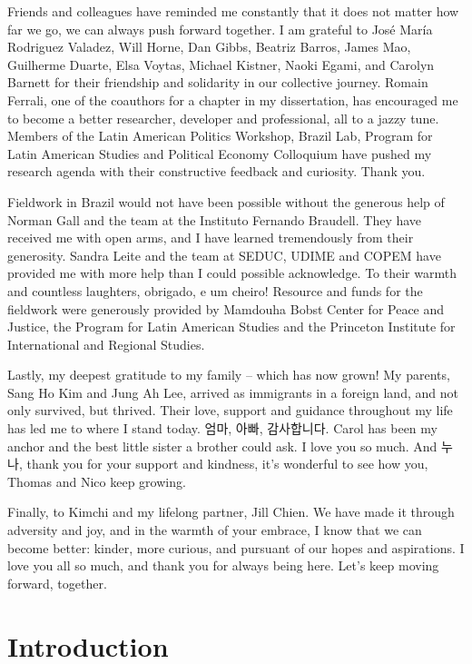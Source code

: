 \documentclass[12pt]{report}
\theoremstyle{definition}
\begin{document}
Friends and colleagues have reminded me constantly that it does not matter how far we go, we can always push forward together. I am grateful to Jos\'{e} Mar\'{i}a Rodriguez Valadez, Will Horne, Dan Gibbs, Beatriz Barros, James Mao, Guilherme Duarte, Elsa Voytas, Michael Kistner, Naoki Egami, and Carolyn Barnett for their friendship and solidarity in our collective journey. Romain Ferrali, one of the coauthors for a chapter in my dissertation, has encouraged me to become a better researcher, developer and professional, all to a jazzy tune. Members of the Latin American Politics Workshop, Brazil Lab, Program for Latin American Studies and Political Economy Colloquium have pushed my research agenda with their constructive feedback and curiosity. Thank you.

Fieldwork in Brazil would not have been possible without the generous help of Norman Gall and the team at the Instituto Fernando Braudell. They have received me with open arms, and I have learned tremendously from their generosity. Sandra Leite and the team at SEDUC, UDIME and COPEM have provided me with more help than I could possible acknowledge. To their warmth and countless laughters, obrigado, e um cheiro! Resource and funds for the fieldwork were generously provided by Mamdouha Bobst Center for Peace and Justice, the Program for Latin American Studies and the Princeton Institute for International and Regional Studies.

Lastly, my deepest gratitude to my family -- which has now grown! My parents, Sang Ho Kim and Jung Ah Lee, arrived as immigrants in a foreign land, and not only survived, but thrived. Their love, support and guidance throughout my life has led me to where I stand today. 엄마, 아빠, 감사합니다. Carol has been my anchor and the best little sister a brother could ask. I love you so much. And 누나, thank you for your support and kindness, it's wonderful to see how you, Thomas and Nico keep growing.

Finally, to Kimchi and my lifelong partner, Jill Chien. We have made it through adversity and joy, and in the warmth of your embrace, I know that we can become better: kinder, more curious, and pursuant of our hopes and aspirations. I love you all so much, and thank you for always being here. Let's keep moving forward, together.

\newpage

\section*{Introduction}
\end{document}

